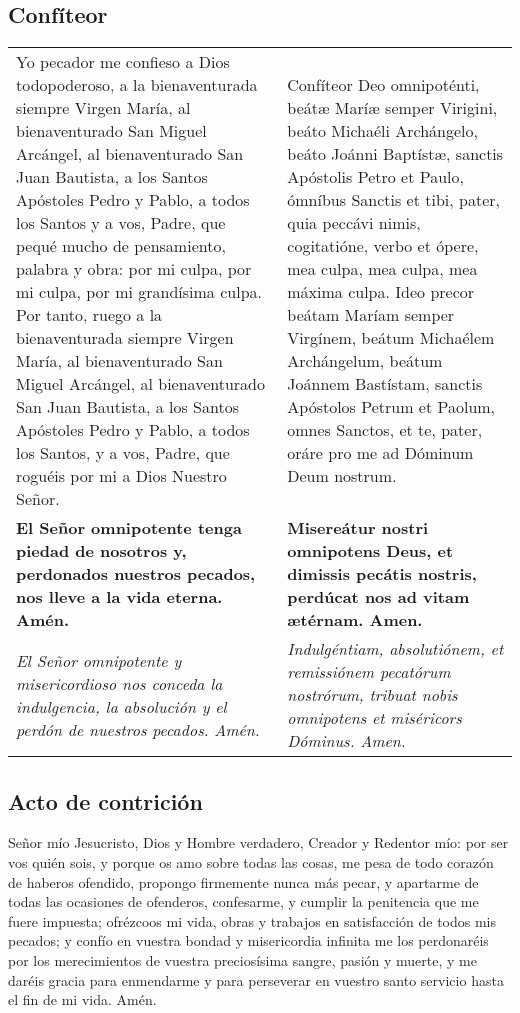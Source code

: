 \documentclass[./devocionario.tex]{subfiles}
\begin{document}
    \subsection*{Confíteor}
    \begin{tabular} { p{} p{} }
        Yo pecador me confieso a Dios todopoderoso, a la bienaventurada siempre Virgen María, al bienaventurado San Miguel Arcángel, 
        al bienaventurado San Juan Bautista, a los Santos Apóstoles Pedro y Pablo, a todos los Santos y a vos, Padre, que pequé mucho 
        de pensamiento, palabra y obra: por mi culpa, por mi culpa, por mi grandísima culpa. Por tanto, ruego a la bienaventurada 
        siempre Virgen María, al bienaventurado San Miguel Arcángel, al bienaventurado San Juan Bautista, a los Santos Apóstoles 
        Pedro y Pablo, a todos los Santos, y a vos, Padre, que roguéis por mi a Dios Nuestro Señor.
        
        &

        Confíteor Deo omnipoténti, beátæ Maríæ semper Virigini, beáto Michaéli Archángelo, beáto Joánni Baptístæ, sanctis Apóstolis Petro et Paulo, 
        ómníbus Sanctis et tibi, pater, quia peccávi nimis, cogitatióne, verbo et ópere, mea culpa, mea culpa, mea máxima culpa. Ideo precor beátam 
        Maríam semper Virgínem, beátum Michaélem Archángelum, beátum Joánnem Bastístam, sanctis Apóstolos Petrum et Paolum, omnes Sanctos, et te, pater, 
        oráre pro me ad Dóminum Deum nostrum.\\

        \textbf{El Señor omnipotente tenga piedad de nosotros y, perdonados nuestros pecados, nos lleve a la vida eterna. Amén.}

        &

        \textbf{Misereátur nostri omnipotens Deus, et dimissis pecátis nostris, perdúcat nos ad vitam ætérnam. Amen.}\\

        \textit{El Señor omnipotente y misericordioso nos conceda la indulgencia, la absolución y el perdón de nuestros pecados. Amén.}

        &

        \textit{Indulgéntiam, absolutiónem, et remissiónem pecatórum nostrórum, tribuat nobis omnipotens et miséricors Dóminus. Amen.}
    \end{tabular}

    \subsection*{Acto de contrición}
    Señor mío Jesucristo, Dios y Hombre verdadero, Creador y Redentor mío: por ser vos quién sois, y porque os amo sobre todas las cosas, 
    me pesa de todo corazón de haberos ofendido, propongo firmemente nunca más pecar, y apartarme de todas las ocasiones de ofenderos, 
    confesarme, y cumplir la penitencia que me fuere impuesta; ofrézcoos mi vida, obras y trabajos en satisfacción de todos mis pecados; 
    y confío en vuestra bondad y misericordia infinita me los perdonaréis por los merecimientos de vuestra preciosísima sangre, pasión y muerte, 
    y me daréis gracia para enmendarme y para perseverar en vuestro santo servicio hasta el fin de mi vida. Amén.
\end{document}
